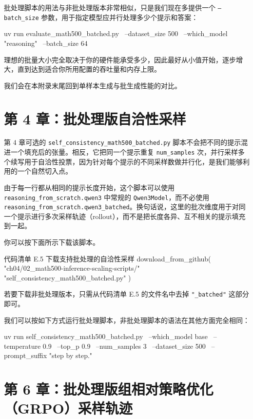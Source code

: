 批处理脚本的用法与非批处理版本非常相似，只是我们现在多提供一个 \texttt{--batch\_size} 参数，用于指定模型应并行处理多少个提示和答案：

\begin{codebox}
uv run evaluate_math500_batched.py \
  --dataset_size 500 \
  --which_model "reasoning" \
  --batch_size 64
\end{codebox}

理想的批量大小完全取决于你的硬件能承受多少，因此最好从小值开始，逐步增大，直到达到适合你所用配置的吞吐量和内存上限。

我们会在本附录末尾回到单样本生成与批生成性能的对比。

\section{第 4 章：批处理版自洽性采样}

第 4 章可选的 \texttt{self\_consistency\_math500\_batched.py} 脚本不会把不同的提示混进一个填充后的张量。相反，它把同一个提示重复 \texttt{num\_samples} 次，并行采样多个续写用于自洽性投票，因为针对每个提示的不同采样数做并行化，是我们能够利用的一个自然切入点。

由于每一行都从相同的提示长度开始，这个脚本可以使用 \texttt{reasoning\_from\_scratch.qwen3} 中常规的 \texttt{Qwen3Model}，而不必使用 \texttt{reasoning\_from\_scratch.qwen3\_batched}。换句话说，这里的批次维度用于对同一个提示进行多次采样轨迹（rollout），而不是把长度各异、互不相关的提示填充到一起。

你可以按下面所示下载该脚本。

\begin{codeboxt}{代码清单 E.5 下载支持批处理的自洽性采样}
download_from_github(
    "ch04/02_math500-inference-scaling-scripts/"
    "self_consistency_math500_batched.py"
)
\end{codeboxt}

若要下载非批处理版本，只需从代码清单 E.5 的文件名中去掉 \texttt{"}\texttt{\_batched}\texttt{"} 这部分即可。

我们可以按如下方式运行批处理脚本，非批处理脚本的语法在其他方面完全相同：

\begin{codebox}
uv run self_consistency_math500_batched.py \
  --which_model base \
  --temperature 0.9 \
  --top_p 0.9 \
  --num_samples 3 \
  --dataset_size 500 \
  --prompt_suffix "\n\nExplain step by step."
\end{codebox}

\section{第 6 章：批处理版组相对策略优化（GRPO）采样轨迹}

